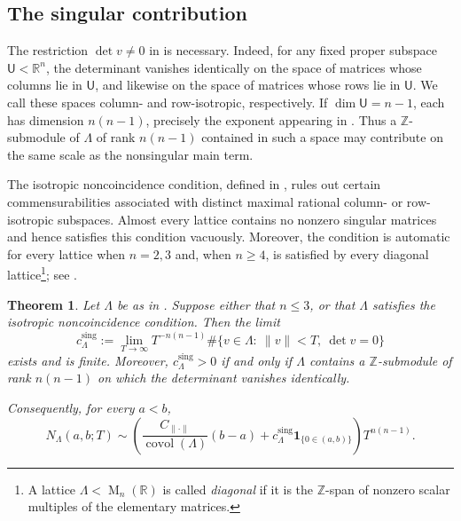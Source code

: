 \documentclass[reqno,11pt]{amsart}
\numberwithin{equation}{section}
\newtheorem{theorem}{Theorem}[section]
\theoremstyle{definition}
\theoremstyle{remark}
\newcommand{\op}{\operatorname}
\newcommand{\R}{\mathbb R}
\newcommand{\M}{\op{M}}
\newcommand{\covol}{\op{covol}}
\begin{document}
\subsection{The singular contribution}
The restriction $\det v\ne0$ in  is necessary. Indeed, for any
fixed proper subspace $\mathsf U<\mathbb R^n$, the determinant vanishes
identically on the space of matrices whose columns lie in $\mathsf U$, and
likewise on the space of matrices whose rows lie in $\mathsf U$. We call
these spaces column- and row-isotropic, respectively. If
$\dim\mathsf U=n-1$, each has dimension $n(n-1)$, precisely the exponent
appearing in . Thus a $\mathbb Z$-submodule of
$\Lambda$ of rank $n(n-1)$ contained in such a space may contribute on the same scale as
the nonsingular main term.


The isotropic noncoincidence condition, defined in
, rules out certain commensurabilities
associated with distinct maximal rational column- or row-isotropic
subspaces. Almost every lattice contains no nonzero singular matrices and
hence satisfies this condition vacuously. Moreover, the condition is
automatic for every lattice when $n=2,3$ and, when $n\ge4$, is
satisfied by every diagonal lattice\footnote{A lattice
$\Lambda<\M_n(\R)$ is called \emph{diagonal} if it is the
$\mathbb Z$-span of nonzero scalar multiples of the elementary matrices.}; see .
\begin{theorem}\label{m11}
Let $\Lambda$ be as in . Suppose either that $n\le 3$, or that
 $\Lambda$ satisfies the isotropic noncoincidence condition. Then the
limit
\begin{equation}\label{eq:intro-singular-asymptotic}
c_\Lambda^{\operatorname{sing}}
:=
\lim_{T\to\infty}T^{-n(n-1)}
\#\{v\in\Lambda:\ \|v\|< T,\ \det v=0\}
\end{equation}
exists and is finite. Moreover, $c_\Lambda^{\operatorname{sing}}>0$ if and
only if $\Lambda$ contains a $\mathbb Z$-submodule of rank $n(n-1)$ on which the
determinant vanishes identically.

Consequently, for every $a<b$,
\begin{equation}\label{eq:intro-full-asymptotic}
N_\Lambda(a,b;T)
\sim
\left(
\frac{C_{\|\cdot\|}}{\covol(\Lambda)}(b-a)
+c_\Lambda^{\operatorname{sing}}\mathbf 1_{\{0\in(a,b)\}}
\right)T^{n(n-1)}.
\end{equation}
\end{theorem}
\end{document}
